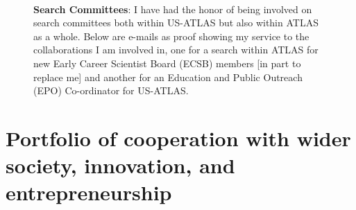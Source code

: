 \begin{figure}[h!]
	\centering
	\caption{\textbf{Search Committees}: I have had the honor of being involved on search committees both within US-ATLAS but also within ATLAS as a whole. Below are e-mails as proof showing my service to the collaborations I am involved in, one for a search within ATLAS for new Early Career Scientist Board (ECSB) members [in part to replace me] and another for an Education and Public Outreach (EPO) Co-ordinator for US-ATLAS.}
	\\
\end{figure}

\chapter{Portfolio of cooperation with wider society, innovation, and entrepreneurship}

